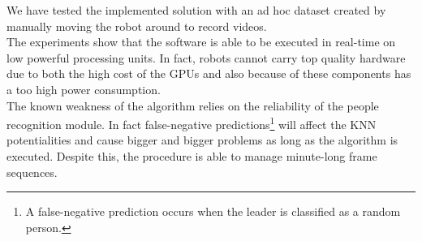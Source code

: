 We have tested the implemented solution with an ad hoc dataset created by manually moving the robot around to record videos.\\
The experiments show that the software is able to be executed in real-time on low powerful processing units. In fact, robots cannot carry top quality hardware due to both the high cost of the GPUs and also because of these components has a too high power consumption.\\
The known weakness of the algorithm relies on the reliability of the people recognition module. In fact false-negative predictions\footnote{A false-negative prediction occurs when the leader is classified as a random person.} will affect the KNN potentialities and cause bigger and bigger problems as long as the algorithm is executed. Despite this, the procedure is able to manage minute-long frame sequences.








